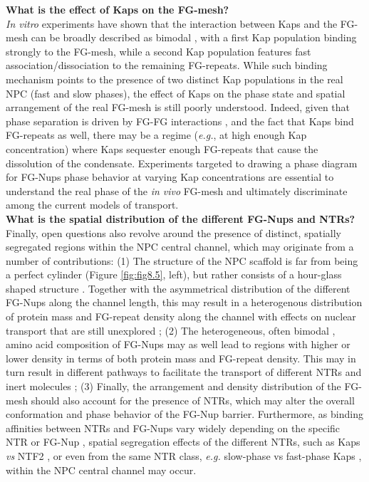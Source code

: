 \noindent \textbf{What is the effect of Kaps on the FG-mesh?}\\ \emph{In vitro} experiments have shown that the interaction between Kaps and the FG-mesh can be broadly described as bimodal \cite{Eisele2010a, Kapinos2014,Kapinos2017a}, with a first Kap population binding strongly to the FG-mesh, while a second Kap population features fast association/dis\-sociation to the remaining FG-repeats. While such binding mechanism points to the presence of two distinct Kap populations in the real NPC (fast and slow phases), the effect of Kaps on the phase state and spatial arrangement of the real FG-mesh is still poorly understood. Indeed, given that phase separation is driven by FG-FG interactions \cite{Frey2006}, and the fact that Kaps bind FG-repeats as well, there may be a regime (\emph{e.g.}, at high enough Kap concentration) where Kaps sequester enough FG-repeats that cause the dissolution of the condensate. Experiments targeted to drawing a phase diagram for FG-Nups phase behavior at varying Kap concentrations are essential to understand the real phase of the \emph{in vivo} FG-mesh and ultimately discriminate among the current models of transport. \\[0.1cm]

\noindent \textbf{What is the spatial distribution of the different FG-Nups and NTRs?}\\
Finally, open questions also revolve around the presence of distinct, spatially segregated regions within the NPC central channel, which may originate from a number of contributions: (1) The structure of the NPC scaffold is far from being a perfect cylinder (Figure \ref{fig:fig8.5}, left), but rather consists of a hour-glass shaped structure \cite{Kim2018}. Together with the asymmetrical distribution of the different FG-Nups along the channel length, this may result in a heterogenous distribution of protein mass and FG-repeat density along the channel with effects on nuclear transport that are still unexplored \cite{Kim2018}; (2) The heterogeneous, often bimodal \cite{Yamada2010}, amino acid composition of FG-Nups may as well lead to regions with higher or lower density in terms of both protein mass and FG-repeat density. This may in turn result in different pathways to facilitate the transport of different NTRs and inert molecules \cite{Yamada2010};
(3) Finally, the arrangement and density distribution of the FG-mesh should also account for the presence of NTRs, which may alter the overall conformation and phase behavior of the FG-Nup barrier. Furthermore, as binding affinities between NTRs and FG-Nups vary widely depending on the specific NTR or FG-Nup \cite{Pyhtila2003}, spatial segregation effects of the different NTRs, such as Kaps \emph{vs} NTF2 \cite{Davis2021,Wagner2015}, or even from the same NTR class, \emph{e.g.} slow-phase vs fast-phase Kaps \cite{Kapinos2014}, within the NPC central channel may occur.\\[0.1pt]

